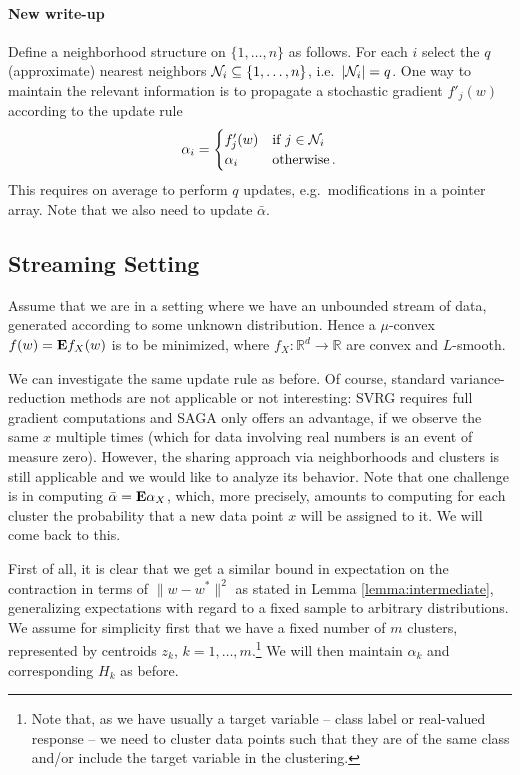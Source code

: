 \documentclass{article}
\newcommand{\E}{{\bf E}}
\renewcommand{\Re}{{\mathbb R}}
\begin{document}
\paragraph{New write-up}

Define a neighborhood structure on $\{1,\dots,n\}$ as follows. For each $i$ select the $q$ (approximate) nearest neighbors ${\cal N}_i \subseteq \{1,\dots,n\}$, i.e.~$|{\cal N}_i| = q$. One way to maintain the relevant information is to propagate a stochastic gradient $f'_j(w)$ according to the update rule 
\begin{align}
\alpha_i = 
\begin{cases}
f_j'(w) & \text{if $j \in {\cal N}_i$} \\
\alpha_i & \text{otherwise} \,.
\end{cases}
\end{align}
This requires on average to perform $q$ updates, e.g.~modifications in a pointer array. Note that we also need to update $\bar \alpha$.

\subsection{Streaming Setting}

Assume that we are in a setting where we have an unbounded stream of data, generated according to some unknown distribution. Hence a $\mu$-convex $f(w) = \E f_X(w)$ is to be minimized, where $f_X: \Re^d \to \Re$ are convex and $L$-smooth. 

We can investigate the same update rule as before. Of course, standard variance-reduction methods are not applicable or not interesting: SVRG requires full gradient computations and SAGA only offers an advantage, if we observe the same $x$ multiple times (which for data involving real numbers is an event of measure zero). However, the sharing approach via neighborhoods and clusters is still applicable and we would like to analyze its behavior. Note that one challenge is in computing $\bar \alpha = \E \alpha_X$, which, more precisely, amounts to computing for each cluster the probability that a new data point $x$ will be assigned to it. We will come back to this. 

First of all, it is clear that we get a similar bound in expectation on the contraction in terms of $\| w - w^*\|^2$ as stated in Lemma \ref{lemma:intermediate}, generalizing expectations with regard to a fixed sample to arbitrary distributions. We assume for simplicity first that we have a fixed number of $m$ clusters, represented by centroids $z_k$, $k=1,\dots,m$.\footnote{Note that, as we have usually a target variable -- class label or real-valued response -- we need to cluster data points such that they are of the same class and/or include the target variable in the clustering.} We will then maintain $\alpha_k$ and corresponding $H_k$ as before. 
\end{document}
